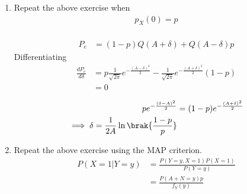 \documentclass[journal,12pt,twocolumn]{IEEEtran}
\renewcommand\thesection{\arabic{section}}
\begin{document}
\begin{enumerate}[label=\thesection.\arabic*
    ,ref=\thesection.\theenumi]
\begin{align}
    P_{e|1} &= P(Y > \delta | X = -1)\\
    &= P(-A+N > \delta|X=-1)\\
    &= P(-A+N > \delta)\\
    &= P(N > \delta + A)\\
    &= Q(A+\delta)
\end{align}
\begin{align}
    P_e &= \frac{1}{2}(Q(A+\delta)+Q(A-\delta))
\end{align}
Differentiating wrt $\delta$ to find maximum
\begin{equation}
    \frac{d Q(x)}{d x} &= -\frac{1}{\sqrt{2\pi}}e^{\frac{-x^2}{2}}
\end{equation}
\begin{align}
    \frac{d P_e}{d\delta} &= \frac{1}{2}(\frac{1}{\sqrt{2\pi}}e^{-\frac{(A-\delta)^2}{2}} - \frac{1}{\sqrt{2\pi}}e^{-\frac{(A+\delta)^2}{2}})\\
    &= 0\\
    \implies \delta = 0 \text{ or }\\
    A = 0 , \delta\in\mathbb{R}
\end{align}
Verifying it is maximum 
\item Repeat the above exercise when 
\begin{align}
    p_{X}(0) = p
\end{align}
\solution\\
\begin{align}
    P_e &= (1-p)Q(A+\delta)+Q(A-\delta)p
\end{align}
Differentiating
\begin{align}
    \frac{d P_e}{d\delta} &= p\frac{1}{\sqrt{2\pi}}e^{-\frac{(A-\delta)^2}{2}} - \frac{1}{\sqrt{2\pi}}e^{-\frac{(A+\delta)^2}{2}}(1-p)\\
    &= 0\\
\end{align}
\begin{align}
    pe^{-\frac{(\delta-A)^2}{2}} &= (1-p)e^{-\frac{(A+\delta)^2}{2}}\\
    \implies \delta = \frac{1}{2A}\ln\brak{\frac{1-p}{p}}
\end{align}
\item Repeat the above exercise using the MAP criterion.\\
\solution
\begin{align}
    P(X = 1|Y = y) &= \frac{P(Y = y, X = 1)P(X =1)}{P(Y=y)}\\
    &= \frac{P(A+N=y)p}{f_Y(y)}\\

\end{align}
\end{enumerate}
\end{document}
